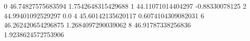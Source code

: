 0 46.74827575683594 1.7542648315429688
1 44.11071014404297 -0.88330078125
2 44.99401092529297 0.0
4 45.60142135620117 0.6074104309082031
6 46.262420654296875 1.2684097290039062
8 46.91787338256836 1.9238624572753906

